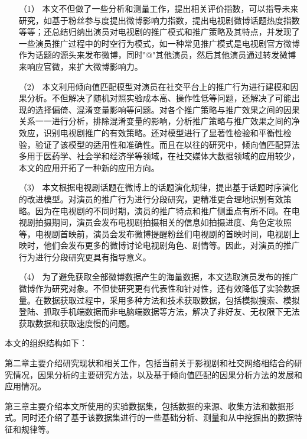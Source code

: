 \begin{itemize}

\item[（1）]本文不但做了一些分析和测量工作，提出相关评价指数，可以指导未来研究，如基于粉丝参与度提出微博影响力指数，提出电视剧微博话题热度指数等等；还总结归纳出演员对电视剧的推广模式和推广策略及其特点，并发现了一些演员推广过程中的时空行为模式，如一种常见推广模式是电视剧官方微博作为话题的源头来发布微博，同时"@"其他演员，然后其他演员通过转发微博来响应官微，来扩大微博影响力。

\item[（2）]本文利用倾向值匹配模型对演员在社交平台上的推广行为进行建模和因果分析。不但解决了随机对照实验成本高、操作性低等问题，还解决了可能出现的选择偏倚、混淆变量影响等问题。对各个推广策略与推广效果之间的因果关系一一进行分析，排除混淆变量的影响，分析推广策略与推广效果之间的净效应，识别电视剧推广的有效策略。还对模型进行了显著性检验和平衡性检验，验证了该模型的适用性和准确性。而且在以往的研究中，倾向值匹配算法多用于医药学、社会学和经济学等领域，在社交媒体大数据领域的应用较少，本文的应用开拓了一种新的应用方向。

\item[（3）]本文根据电视剧话题在微博上的话题演化规律，提出基于话题时序演化的改进模型。对演员的推广行为进行分段研究，更精准更合理地识别有效策略。因为在电视剧的不同时期，演员的推广特点和推广侧重点有所不同。在电视剧拍摄期间，演员会发布电视剧拍摄相关的信息如拍摄进度、角色定妆照等，电视剧首映前，演员会发布微博提醒粉丝们电视剧的首映时间，电视剧上映时，他们会发布更多的微博讨论电视剧角色、剧情等。因此，对演员的推广行为进行分段研究更具有指导意义。

\item[（4）]为了避免获取全部微博数据产生的海量数据，本文选取演员发布的推广微博作为研究对象。不但使研究更有代表性和针对性，还有效降低了实验数据量。在数据获取过程中，采用多种方法和技术获取数据，包括模拟搜索、模拟登陆、抓取手机端数据而非电脑端数据等方法，解决了非好友、无权限下无法获取数据和获取速度慢的问题。

\end{itemize}

本文的组织结构如下：

第二章主要介绍研究现状和相关工作，包括当前关于影视剧和社交网络相结合的研究情况，因果分析的主要研究方法，以及基于倾向值匹配的因果分析方法的发展和应用情况。

第三章主要介绍本文所使用的实验数据集，包括数据的来源、收集方法和数据形式。同时还介绍了基于该数据集进行的一些基础分析、测量和从中挖掘出的数据特征和规律等。

